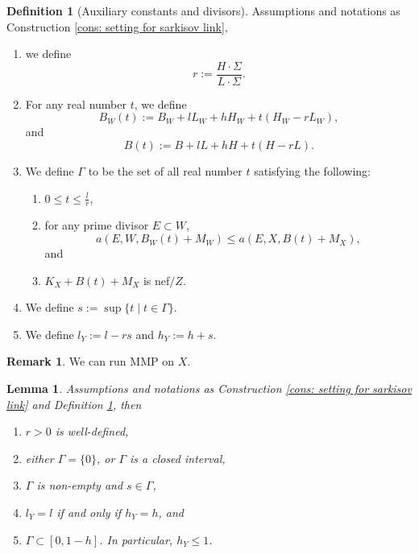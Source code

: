 \documentclass[11pt]{amsart}
\numberwithin{equation}{section}
\newcommand{\Ii}{\Gamma}
\newtheorem{lem}[thm]{Lemma}
\theoremstyle{definition}
\newtheorem{defn}[thm]{Definition}
\theoremstyle{definition}
\theoremstyle{definition}
\newtheorem{remark}[theorem]{Remark}
\begin{document}
\begin{defn}[Auxiliary constants and divisors]\label{defn: auxiliary invariants}
Assumptions and notations as Construction \ref{cons: setting for sarkisov link},
\begin{enumerate}
    \item we define $$r:=\frac{H\cdot\Sigma}{L\cdot\Sigma}.$$
    \item For any real number $t$, we define
    $$B_W(t):=B_W+lL_W+hH_W+t(H_W-rL_W),$$ 
and 
$$B(t):=B+lL+hH+t(H-rL).$$
\item We define $\Gamma$ to be the set of all real number $t$ satisfying the following:
\begin{enumerate}
    \item $0\leq t\leq\frac{l}{r}$,
        \item for any prime divisor $E\subset W$,
    $$a(E,W,B_W(t)+M_W)\leq a(E,X,B(t)+M_X),$$
    and
    \item $K_X+B(t)+M_X$ is nef$/Z$.
\end{enumerate}
\item We define $s:=\sup\{t\mid t\in\Gamma\}$.
\item We define $l_Y:=l-rs$ and $h_Y:=h+s$.
\end{enumerate}
\end{defn}

\begin{remark}
  We can run MMP on $X$. 
\end{remark}

\begin{lem}\label{lem: sarkisov h<=1}
Assumptions and notations as Construction \ref{cons: setting for sarkisov link} and Definition \ref{defn: auxiliary invariants}, then 
\begin{enumerate}
\item $r>0$ is well-defined,
    \item either $\Ii=\{0\}$, or $\Ii$ is a closed interval,
    \item $\Ii$ is non-empty and $s\in\Ii$, 
    \item $l_Y=l$ if and only if $h_Y=h$, and
    \item $\Ii\subset [0,1-h]$. In particular, $h_Y\leq 1$.
\end{enumerate}
\end{lem}
\end{document}
